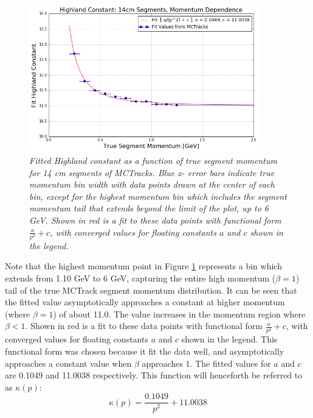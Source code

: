 \begin{figure}[ht!]
\begin{center}
\includegraphics[width=100mm]{Figures/highland_constant_optimization_momentumdependent.png}
\end{center}
\caption{\textit{Fitted Highland constant as a function of true segment momentum for 14 cm segments of {\sc MCTracks}. Blue x- error bars indicate true momentum bin width with data points drawn at the center of each bin, except for the highest momentum bin which includes the segment momentum tail that extends beyond the limit of the plot, up to 6 GeV. Shown in red is a fit to these data points with functional form $\frac{a}{p^2} + c$, with converged values for floating constants $a$ and $c$ shown in the legend.}}
\label{retune_highland_fig3}
\end{figure}

Note that the highest momentum point in Figure \ref{retune_highland_fig3} represents a bin which extends from 1.10 GeV to 6 GeV, capturing the entire high momentum ($\beta = 1$) tail of the true {\sc MCTrack} segment momentum distribution. It can be seen that the fitted value asymptotically approaches a constant at higher momentum (where $\beta = 1$) of about 11.0. The value increases in the momentum region where $\beta < 1$. Shown in red is a fit to these data points with functional form $\frac{a}{p^2} + c$, with converged values for floating constants $a$ and $c$ shown in the legend. This functional form was chosen because it fit the data well, and asymptotically approaches a constant value when $\beta$ approaches 1. The fitted values for $a$ and $c$ are 0.1049 and 11.0038 respectively. This function will henceforth be referred to as $\kappa(p)$:
\begin{equation}
\kappa(p) = \frac{0.1049}{p^2} + 11.0038
\end{equation}\label{kappa_equation}

